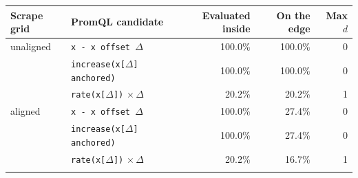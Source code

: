 \begin{tabular}{@{}llrrr@{}}
\toprule
Scrape grid & PromQL candidate & Evaluated inside & On the edge & Max $d$ \\
\midrule
unaligned & \texttt{x - x offset $\Delta$} & 100.0\% & 100.0\% & 0 \\
 & \texttt{increase(x[$\Delta$] anchored)} & 100.0\% & 100.0\% & 0 \\
 & \texttt{rate(x[$\Delta$])} $\times\,\Delta$ & 20.2\% & 20.2\% & 1 \\
\addlinespace
aligned & \texttt{x - x offset $\Delta$} & 100.0\% & 27.4\% & 0 \\
 & \texttt{increase(x[$\Delta$] anchored)} & 100.0\% & 27.4\% & 0 \\
 & \texttt{rate(x[$\Delta$])} $\times\,\Delta$ & 20.2\% & 16.7\% & 1 \\
\addlinespace
\bottomrule
\end{tabular}
